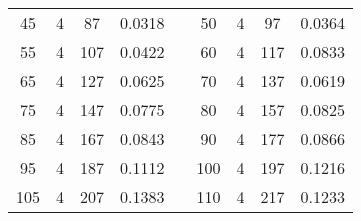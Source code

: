 \documentclass[a4paper, 12pt, french,oneside]{book}
\begin{document}
\begin{table}[!ht]
\begin{tabularx}{\linewidth}{|c|c|c|c|X|c|c|c|c|}
        45           & 4            & 87              & 0.0318                        &  &

        50           & 4            & 97              & 0.0364                                                                                                           \\

        55           & 4            & 107             & 0.0422                        &  &

        60           & 4            & 117             & 0.0833                                                                                                           \\

        65           & 4            & 127             & 0.0625                        &  &

        70           & 4            & 137             & 0.0619                                                                                                           \\

        75           & 4            & 147             & 0.0775                        &  &

        80           & 4            & 157             & 0.0825                                                                                                           \\

        85           & 4            & 167             & 0.0843                        &  &

        90           & 4            & 177             & 0.0866                                                                                                           \\

        95           & 4            & 187             & 0.1112                        &  &

        100          & 4            & 197             & 0.1216                                                                                                           \\

        105          & 4            & 207             & 0.1383                        &  &

        110          & 4            & 217             & 0.1233                                                                                                           \\


\end{tabularx}
\end{table}
\end{document}
